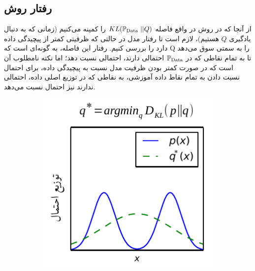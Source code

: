 \subsection{ 
    رفتار \meanseeking{} روش \maxlikelihood{}}
از آنجا که در روش \maxlikelihood{} در واقع فاصله $KL(\mathbb P_\text{Data} ~ || Q)$ را کمینه می‌کنیم (زمانی که به دنبال یادگیری $Q$ هستیم)، لازم است تا رفتار مدل در حالتی که ظرفیتی کمتر از پیچیدگی داده دارد را بررسی کنیم. رفتار این فاصله، به گونه‌ای است که Q را به سمتی سوق می‌دهد تا به تمام نقاطی که در $\mathbb P_\text{Data}$ احتمالی دارند، احتمالی نسبت دهد؛ اما نکته نامطلوب آن است که در صورت کمتر بودن ظرفیت مدل نسبت به پیچیدگی داده، برای احتمال نسبت دادن به تمام نقاط داده آموزشی، به نقاطی که در توزیع اصلی داده، احتمالی ندارند نیز احتمال نسبت می‌دهد.
\begin{figure}[h]
	\centering
	\begin{subfigure}[t!]{.4\textwidth}
		\centering
		\includegraphics[height=1.\textwidth]{images/KLvsReverseKL_KL.pdf}
		\caption{}
		\label{fig:meanseeking_KL}
	\end{subfigure}
	\begin{subfigure}[t!]{.4\textwidth}
		\centering

\end{subfigure}
\end{figure}
